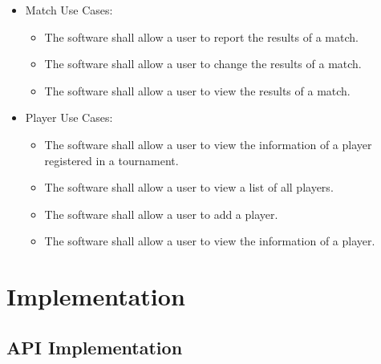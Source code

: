 \documentclass[11pt]{article}
\begin{document}
\begin{itemize}
        \item Match Use Cases:
        \begin{itemize}
            \item The software shall allow a user to report the results of a match.
            \item The software shall allow a user to change the results of a match.
            \item The software shall allow a user to view the results of a match.
        \end{itemize}
        
        \item Player Use Cases:
        \begin{itemize}
            \item The software shall allow a user to view the information of a player registered in a tournament.
            \item The software shall allow a user to view a list of all players.
            \item The software shall allow a user to add a player.
            \item The software shall allow a user to view the information of a player.
        \end{itemize}

    \end{itemize}
    
    \section {Implementation}
    
    \subsection {API Implementation}
\end{document}
